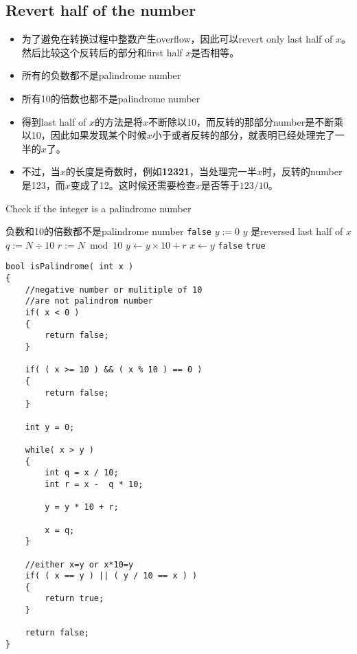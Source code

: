 \subsection{Revert half of the number}
\begin{itemize}
\item 为了避免在转换过程中整数产生overflow，因此可以revert only last half of $x$。然后比较这个反转后的部分和first half $x$是否相等。
\item 所有的负数都不是palindrome number
\item 所有10的倍数也都不是palindrome number
\item 得到last half of $x$的方法是将$x$不断除以10，而反转的那部分number是不断乘以10，因此如果发现某个时候$x$小于或者反转的部分，就表明已经处理完了一半的$x$了。
\item 不过，当$x$的长度是奇数时，例如\textbf{12321}，当处理完一半$x$时，反转的number是123，而$x$变成了12。这时候还需要检查$x$是否等于$123/10$。
\end{itemize}
\setcounter{algorithm}{0}
\begin{algorithm}[H]
\caption{Check if the integer is a palindrome number}
\begin{algorithmic}[1]
 \Comment 负数和10的倍数都不是palindrome number
\State \Return \texttt{false} 
\EndIf
\State \textbf{$y := 0$} \Comment $y$ 是reversed last half of $x$
\State $q := N\div 10$
\State $r := N\bmod 10$
\State $y \gets y\times 10 + r$
\State $x\gets y$ 
\EndWhile
{} 
\State \Return \texttt{false}
\Else
\State \Return \texttt{true}
\EndIf
\EndProcedure
\end{algorithmic}
\end{algorithm}
\setcounter{lstlisting}{0}
\begin{lstlisting}[style=customc, caption={Revert half of the number}]
bool isPalindrome( int x )
{
    //negative number or mulitiple of 10
    //are not palindrom number
    if( x < 0 )
    {
        return false;
    }

    if( ( x >= 10 ) && ( x % 10 ) == 0 )
    {
        return false;
    }

    int y = 0;

    while( x > y )
    {
        int q = x / 10;
        int r = x -  q * 10;

        y = y * 10 + r;

        x = q;
    }

    //either x=y or x*10=y
    if( ( x == y ) || ( y / 10 == x ) )
    {
        return true;
    }

    return false;
}
\end{lstlisting}